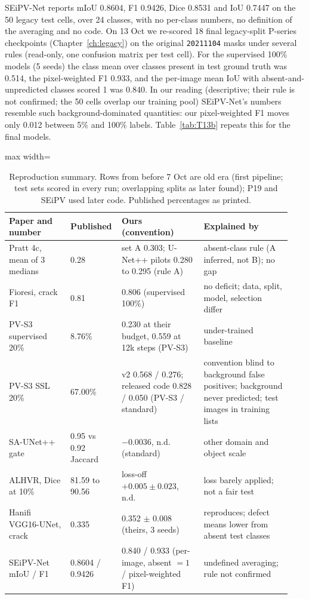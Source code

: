 SEiPV-Net \citep{eesaar2023seipv} reports mIoU 0.8604, F1 0.9426, Dice 0.8531 and IoU 0.7447 on the 50 legacy test cells, over 24
classes, with no per-class numbers, no definition of the averaging and no code. On 13 Oct we re-scored 18 final legacy-split P-series
checkpoints (Chapter~\ref{ch:legacy}) on the original \texttt{20211104} masks under several rules (read-only, one confusion matrix per
test cell). For the supervised 100\% models (5 seeds) the class mean over classes present in test ground truth was 0.514, the
pixel-weighted F1 0.933, and the per-image mean IoU with absent-and-unpredicted classes scored 1 was 0.840. In our reading (descriptive;
their rule is not confirmed; the 50 cells overlap our training pool) SEiPV-Net's numbers resemble such background-dominated quantities: our pixel-weighted F1 moves only 0.012
between 5\% and 100\% labels. Table~\ref{tab:T13b} repeats this for the final models.

\begin{table}[htbp]
\centering
\footnotesize
\caption{Reproduction summary. Rows from before 7 Oct are old era (first pipeline; test sets scored in every run; overlapping splits as
later found); P19 and SEiPV used later code. Published percentages as printed.}
\label{tab:repro-summary}
\begin{adjustbox}{max width=\linewidth}
\begin{tabular}{@{}p{0.21\linewidth}p{0.14\linewidth}p{0.29\linewidth}p{0.30\linewidth}@{}}
\toprule
Paper and number & Published & Ours (convention) & Explained by \\
\midrule
Pratt 4c, mean of 3 medians & 0.28 & set A 0.303; U-Net++ pilots 0.280 to 0.295 (rule A) & absent-class rule (A inferred, not B); no gap \\
Fioresi, crack F1 & 0.81 & 0.806 (supervised 100\%) & no deficit; data, split, model, selection differ \\
PV-S3 supervised 20\% & 8.76\% & 0.230 at their budget, 0.559 at 12k steps (PV-S3) & under-trained baseline \\
PV-S3 SSL 20\% & 67.00\% & v2 0.568 / 0.276; released code 0.828 / 0.050 (PV-S3 / standard) & convention blind to background false positives; background never predicted; test images in training lists \\
SA-UNet++ gate & 0.95 vs 0.92 Jaccard & $-0.0036$, n.d. (standard) & other domain and object scale \\
ALHVR, Dice at 10\% & 81.59 to 90.56 & loss-off $+0.005 \pm 0.023$, n.d. & loss barely applied; not a fair test \\
Hanifi VGG16-UNet, crack & 0.335 & 0.352 $\pm$ 0.008 (theirs, 3 seeds) & reproduces; defect means lower from absent test classes \\
SEiPV-Net mIoU / F1 & 0.8604 / 0.9426 & 0.840 / 0.933 (per-image, absent $=1$ / pixel-weighted F1) & undefined averaging; rule not confirmed \\
\bottomrule
\end{tabular}
\end{adjustbox}
\end{table}

